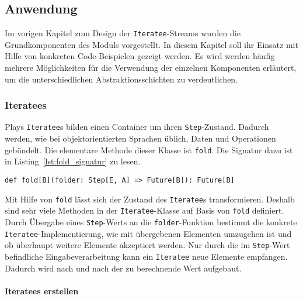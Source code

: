 \documentclass[draft=false
              ,paper=a4
              ,twoside=false
              ,fontsize=11pt
              ,headsepline
              ,BCOR10mm
              ,DIV11
              ]{scrbook}
\begin{document}





\subsection{Anwendung} %
\label{sub:anwendung}

Im vorigen Kapitel zum Design der \lstinline|Iteratee|-Streams wurden die Grundkomponenten des Moduls vorgestellt.
In diesem Kapitel soll ihr Einsatz mit Hilfe von konkreten Code-Beispielen gezeigt werden.
Es wird werden häufig mehrere Möglichkeiten für die Verwendung der einzelnen Komponenten erläutert, um die unterschiedlichen Abstraktionsschichten zu verdeutlichen.


\subsubsection{Iteratees} %
\label{sssec:iteratees}

Plays \lstinline|Iteratee|s bilden einen Container um ihren \lstinline|Step|-Zustand.
Dadurch werden, wie bei objektorientierten Sprachen üblich, Daten und Operationen gebündelt.
Die elementare Methode dieser Klasse ist \lstinline|fold|.
Die Signatur dazu ist in Listing~\ref{lst:fold_signatur} zu lesen.
\begin{lstlisting}[caption=Die Signatur von fold, label=lst:fold_signatur]
def fold[B](folder: Step[E, A] => Future[B]): Future[B]
\end{lstlisting}

Mit Hilfe von \lstinline|fold| lässt sich der Zustand des \lstinline|Iteratee|s transformieren.
Deshalb sind sehr viele Methoden in der \lstinline|Iteratee|-Klasse auf Basis von \lstinline|fold| definiert.
Durch Übergabe eines \lstinline|Step|-Werts an die \lstinline|folder|-Funktion bestimmt die konkrete \lstinline|Iteratee|-Implementierung, wie mit übergebenen Elementen umzugehen ist und ob überhaupt weitere Elemente akzeptiert werden.
Nur durch die im \lstinline|Step|-Wert befindliche Eingabeverarbeitung kann ein \lstinline|Iteratee| neue Elemente empfangen.
Dadurch wird nach und nach der zu berechnende Wert aufgebaut.

\paragraph{Iteratees erstellen} %
\label{par:iteratees_erstellen}\mbox{} %
\end{document}
